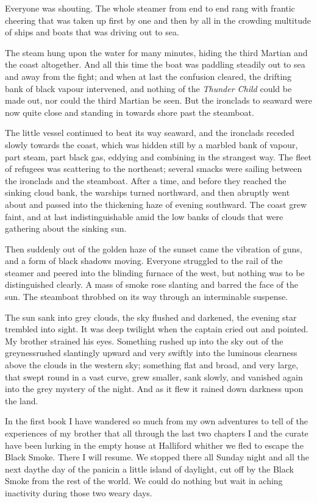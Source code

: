 Everyone was shouting. The whole steamer from end to end rang with
frantic cheering that was taken up first by one and then by all in
the crowding multitude of ships and boats that was driving out to
sea.

The steam hung upon the water for many minutes, hiding the third
Martian and the coast altogether. And all this time the boat was
paddling steadily out to sea and away from the fight; and when at
last the confusion cleared, the drifting bank of black vapour
intervened, and nothing of the \emph{Thunder Child} could be made
out, nor could the third Martian be seen. But the ironclads to
seaward were now quite close and standing in towards shore past the
steamboat.

The little vessel continued to beat its way seaward, and the
ironclads receded slowly towards the coast, which was hidden still
by a marbled bank of vapour, part steam, part black gas, eddying
and combining in the strangest way. The fleet of refugees was
scattering to the northeast; several smacks were sailing between
the ironclads and the steamboat. After a time, and before they
reached the sinking cloud bank, the warships turned northward, and
then abruptly went about and passed into the thickening haze of
evening southward. The coast grew faint, and at last
indistinguishable amid the low banks of clouds that were gathering
about the sinking sun.

Then suddenly out of the golden haze of the sunset came the
vibration of guns, and a form of black shadows moving. Everyone
struggled to the rail of the steamer and peered into the blinding
furnace of the west, but nothing was to be distinguished clearly. A
mass of smoke rose slanting and barred the face of the sun. The
steamboat throbbed on its way through an interminable suspense.

The sun sank into grey clouds, the sky flushed and darkened, the
evening star trembled into sight. It was deep twilight when the
captain cried out and pointed. My brother strained his eyes.
Something rushed up into the sky out of the greyness\dash{}rushed
slantingly upward and very swiftly into the luminous clearness
above the clouds in the western sky; something flat and broad, and
very large, that swept round in a vast curve, grew smaller, sank
slowly, and vanished again into the grey mystery of the night. And
as it flew it rained down darkness upon the land.

In the first book I have wandered so much from my own adventures to
tell of the experiences of my brother that all through the last two
chapters I and the curate have been lurking in the empty house at
Halliford whither we fled to escape the Black Smoke. There I will
resume. We stopped there all Sunday night and all the next day\dash{}the
day of the panic\dash{}in a little island of daylight, cut off by the
Black Smoke from the rest of the world. We could do nothing but
wait in aching inactivity during those two weary days.

